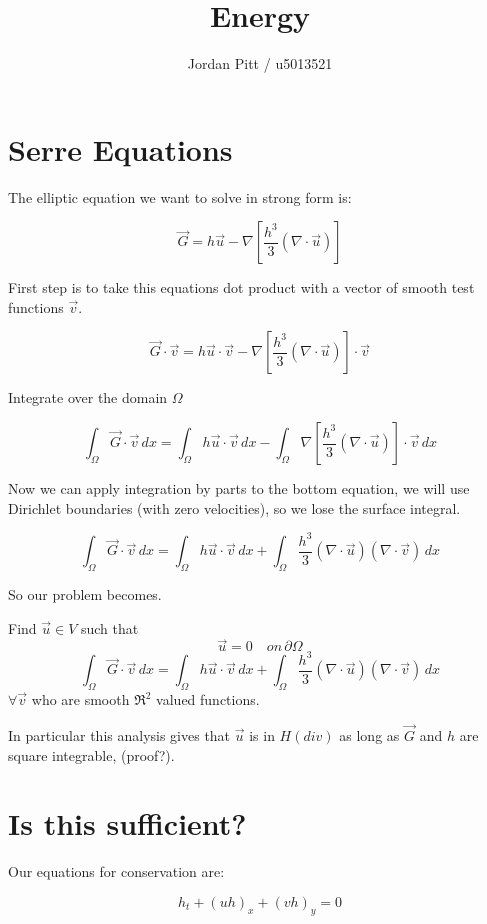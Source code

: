 \documentclass[12pt]{article}
\begin{document}
\title{Energy}
\author{Jordan Pitt / u5013521}

\section{Serre Equations}

The elliptic equation we want to solve in strong form is:

\[\vec{G} = h\vec{u} - \nabla \left[\frac{h^3}{3} \left(\nabla \cdot \vec{u}\right)\right]\]

First step is to take this equations dot product with a vector of smooth test functions $\vec{v}$.

\[\vec{G} \cdot \vec{v} = h\vec{u}\cdot \vec{v} - \nabla \left[\frac{h^3}{3} \left(\nabla \cdot \vec{u}\right)\right] \cdot \vec{v}\]

Integrate over the domain $\Omega$

\[\int_{\Omega}\vec{G} \cdot \vec{v} \, dx = \int_{\Omega} h\vec{u}\cdot \vec{v} \, dx - \int_{\Omega}\nabla \left[\frac{h^3}{3} \left(\nabla \cdot \vec{u}\right)\right] \cdot \vec{v}\, dx\]

Now we can apply integration by parts to the bottom equation, we will use Dirichlet boundaries (with zero velocities), so we lose the surface integral.

\[\int_{\Omega}\vec{G} \cdot \vec{v} \, dx = \int_{\Omega} h\vec{u}\cdot \vec{v} \, dx + \int_{\Omega} \frac{h^3}{3} \left(\nabla \cdot \vec{u}\right) \left(\nabla\cdot \vec{v}\right) \, dx\]

So our problem becomes.

Find $\vec{u} \in V$ such that
\[\vec{u} = 0 \quad on \, \partial \Omega\]
\[\int_{\Omega}\vec{G} \cdot \vec{v} \, dx = \int_{\Omega} h\vec{u}\cdot \vec{v} \, dx + \int_{\Omega} \frac{h^3}{3} \left(\nabla \cdot \vec{u}\right) \left(\nabla\cdot \vec{v}\right) \, dx\]
$\forall \vec{v}$ who are smooth $\Re^2$ valued functions.

In particular this analysis gives that $\vec{u}$ is in $H(div)$ as long as $\vec{G}$ and $h$ are square integrable, (proof?).

\section{Is this sufficient?}
Our equations for conservation are:

\begin{equation}
\label{h}
h_t + (uh)_x + (vh)_y = 0
\end{equation}
\end{document}
